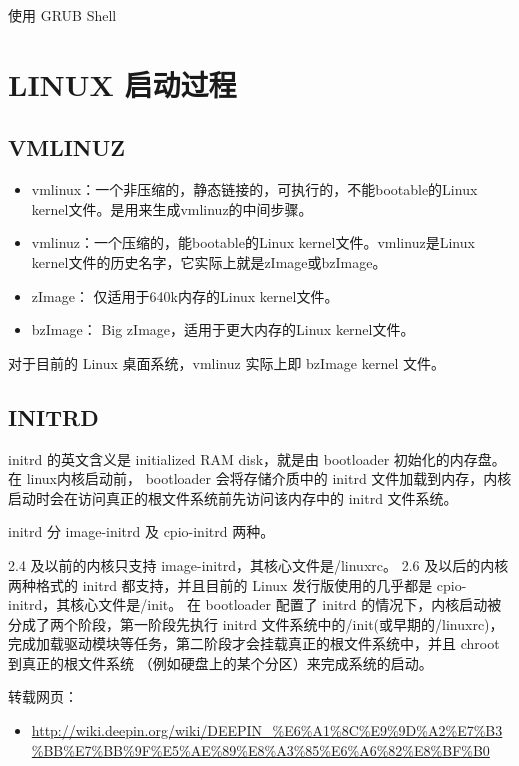 \documentclass[doctor,openright,twoside]{sjtuthesis}
\providecommand{\tightlist}{%
    \setlength{\itemsep}{0pt}\setlength{\parskip}{0pt}}
\theoremstyle{plain}
\theoremstyle{definition}
\theoremstyle{remark}
\theoremstyle{ocrenumbox}
\theoremstyle{plain}
\begin{document}
使用 GRUB Shell

\hypertarget{linux--2}{%
\section{LINUX 启动过程}\label{linux--2}}

\hypertarget{vmlinuz}{%
\subsection{VMLINUZ}\label{vmlinuz}}

\begin{itemize}
\tightlist
\item
  vmlinux：一个非压缩的，静态链接的，可执行的，不能bootable的Linux kernel文件。是用来生成vmlinuz的中间步骤。
\item
  vmlinuz：一个压缩的，能bootable的Linux kernel文件。vmlinuz是Linux kernel文件的历史名字，它实际上就是zImage或bzImage。
\item
  zImage： 仅适用于640k内存的Linux kernel文件。
\item
  bzImage： Big zImage，适用于更大内存的Linux kernel文件。
\end{itemize}

对于目前的 Linux 桌面系统，vmlinuz 实际上即 bzImage kernel 文件。

\hypertarget{initrd}{%
\subsection{INITRD}\label{initrd}}

initrd 的英文含义是 initialized RAM disk，就是由 bootloader 初始化的内存盘。在 linux内核启动前， bootloader 会将存储介质中的 initrd 文件加载到内存，内核启动时会在访问真正的根文件系统前先访问该内存中的 initrd 文件系统。

initrd 分 image-initrd 及 cpio-initrd 两种。

2.4 及以前的内核只支持 image-initrd，其核心文件是/linuxrc。 2.6 及以后的内核两种格式的 initrd 都支持，并且目前的 Linux 发行版使用的几乎都是 cpio-initrd，其核心文件是/init。 在 bootloader 配置了 initrd 的情况下，内核启动被分成了两个阶段，第一阶段先执行 initrd 文件系统中的/init(或早期的/linuxrc)，完成加载驱动模块等任务，第二阶段才会挂载真正的根文件系统中，并且 chroot 到真正的根文件系统 （例如硬盘上的某个分区）来完成系统的启动。

转载网页：

\begin{itemize}
\tightlist
\item
  \url{http://wiki.deepin.org/wiki/DEEPIN_\%E6\%A1\%8C\%E9\%9D\%A2\%E7\%B3\%BB\%E7\%BB\%9F\%E5\%AE\%89\%E8\%A3\%85\%E6\%A6\%82\%E8\%BF\%B0}
\end{itemize}
\end{document}
